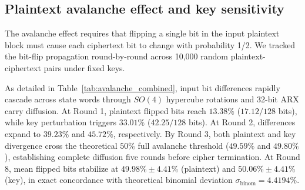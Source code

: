 \documentclass[10pt,twocolumn]{article}
\begin{document}
\subsection{Plaintext avalanche effect and key sensitivity}
\label{subsec:avalanche_sensitivity}
The avalanche effect requires that flipping a single bit in the input plaintext block must cause each ciphertext bit to change with probability 1/2. We tracked the bit-flip propagation round-by-round across 10,000 random plaintext-ciphertext pairs under fixed keys.

\begin{table}[htbp]
\caption{Plaintext avalanche effect and key sensitivity propagation across rounds 1 to 8 (10,000 executions)}
\label{tab:avalanche_combined}
\centering
\small
{}
\end{table}

As detailed in Table~\ref{tab:avalanche_combined}, input bit differences rapidly cascade across state words through $SO(4)$ hypercube rotations and 32-bit ARX carry diffusion. At Round 1, plaintext flipped bits reach $13.38\%$ ($17.12 / 128$ bits), while key perturbation triggers $33.01\%$ ($42.25 / 128$ bits). At Round 2, differences expand to $39.23\%$ and $45.72\%$, respectively. By Round 3, both plaintext and key divergence cross the theoretical $50\%$ full avalanche threshold ($49.59\%$ and $49.80\%$), establishing complete diffusion five rounds before cipher termination. At Round 8, mean flipped bits stabilize at $49.98\% \pm 4.41\%$ (plaintext) and $50.06\% \pm 4.41\%$ (key), in exact concordance with theoretical binomial deviation $\sigma_{\text{binom}} = 4.4194\%$.
\end{document}
